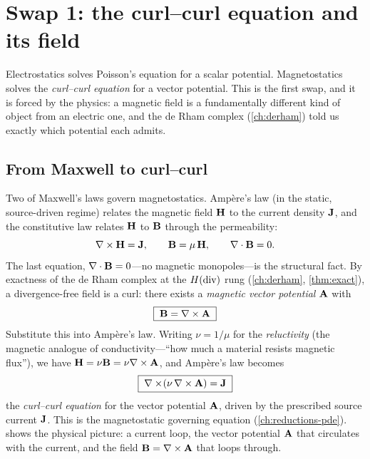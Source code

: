 \section{Swap 1: the curl--curl equation and its field}
\label{sec:swap1}

Electrostatics solves Poisson's equation for a scalar potential. Magnetostatics
solves the \emph{curl--curl equation} for a vector potential. This is the first
swap, and it is forced by the physics: a magnetic field is a fundamentally
different kind of object from an electric one, and the de Rham complex
(\cref{ch:derham}) told us exactly which potential each admits.

\subsection{From Maxwell to curl--curl}

Two of Maxwell's laws govern magnetostatics. Amp\`ere's law (in the static,
source-driven regime) relates the magnetic field $\mathbf{H}$ to the current density
$\mathbf{J}$, and the constitutive law relates $\mathbf{H}$ to $\mathbf{B}$ through the permeability:
\[
  \nabla\times\mathbf{H} = \mathbf{J}, \qquad \mathbf{B} = \mu\,\mathbf{H}, \qquad \nabla\cdot\mathbf{B} = 0 .
\]
The last equation, $\nabla\cdot\mathbf{B}=0$---no magnetic monopoles---is the structural fact.
By exactness of the de Rham complex at the $H(\mathrm{div})$ rung (\cref{ch:derham},
\cref{thm:exact}), a divergence-free field is a curl: there exists a
\emph{magnetic vector potential} $\mathbf{A}$ with
\[
  \boxed{\;\mathbf{B} = \nabla\times\mathbf{A}\;}
\]
Substitute this into Amp\`ere's law. Writing $\nu=1/\mu$ for the
\emph{reluctivity} (the magnetic analogue of conductivity---``how much a material
resists magnetic flux''), we have $\mathbf{H}=\nu\mathbf{B}=\nu\nabla\times\mathbf{A}$, and Amp\`ere's law
becomes
\begin{equation}
  \boxed{\;\nabla\times\!\left(\nu\,\nabla\times\mathbf{A}\right) = \mathbf{J}\;}
  \label{eq:curlcurl}
\end{equation}
the \emph{curl--curl equation} for the vector potential $\mathbf{A}$, driven by the
prescribed source current $\mathbf{J}$. This is the magnetostatic governing equation
(\cref{ch:reductions-pde}).  shows the physical picture: a
current loop, the vector potential $\mathbf{A}$ that circulates with the current, and the
field $\mathbf{B}=\nabla\times\mathbf{A}$ that loops through.

